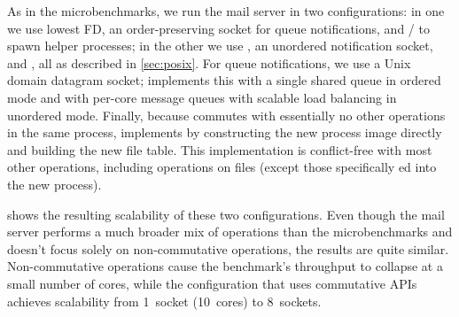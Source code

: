 As in the microbenchmarks, we run the mail server in two configurations:
in one we use lowest FD, an order-preserving socket for queue
notifications, and / to spawn helper processes; in
the other we use , an unordered notification socket, and
, all as described in \cref{sec:posix}.
For queue notifications, we use a Unix domain datagram socket;
\sys implements this with a single shared queue in ordered mode and with
per-core message queues with scalable load balancing in unordered
mode.  Finally, because  commutes with essentially no other
operations in the same process,
\sys implements  by constructing the new process image
directly and building the new file
table. This implementation is conflict-free with most other operations,
including operations on
 files (except those specifically ed into the
new process).

 shows the resulting scalability of these two
configurations.  Even though the mail server performs a much broader mix
of operations than the microbenchmarks and doesn't focus solely on
non-commutative operations, the results are quite similar.
Non-commutative operations cause the benchmark's throughput to collapse
at a small number of cores, while the configuration that uses
commutative APIs achieves 
scalability from 1~socket
(10~cores) to 8~sockets.
%
%



%   

\begin{comment}
\begin{figure}
  \centering
  
  \caption{Scalability of $n$ cores forking and exiting a process on xv6
    and Linux.}
  \label{fig:forktest}
\end{figure}
\end{comment}
